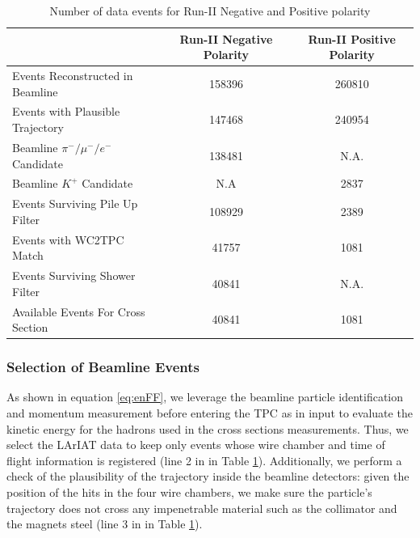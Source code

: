 \begin{table}[b]
\centering
\begin{tabular}{|l|c|c|}
\hline
                                                        & Run-II Negative Polarity   &  Run-II Positive Polarity  \\ \hline
Events Reconstructed in Beamline        &  158396  & 260810  \\ \hline
Events with Plausible Trajectory            &   147468 & 240954  \\ \hline
Beamline $\pi^-/\mu^-/e^-$  Candidate  &   138481 &     N.A.   \\ \hline
Beamline $K^+$   Candidate                 &    N.A       & 2837     \\ \hline
Events Surviving Pile Up Filter              &   108929  & 2389       \\ \hline
Events with WC2TPC Match                 &    41757   & 1081 \\ \hline
Events Surviving Shower Filter             &    40841    &  N.A.     \\ \hline
Available Events For Cross Section      &   40841    &   1081    \\ \hline
\end{tabular}
\caption{Number of data events for Run-II Negative and Positive polarity }
\label{tab:beamlineDataSelection}
\end{table}


\subsubsection{Selection of Beamline Events}\label{ch:beamlineDetectorsData}
As shown in equation \ref{eq:enFF}, we leverage the beamline particle identification and momentum measurement before entering the TPC as in input to evaluate the kinetic energy for the hadrons used in the  cross sections measurements. Thus, we select the LArIAT data to keep only events whose wire chamber and time of flight information is registered (line 2 in in Table \ref{tab:beamlineDataSelection}). Additionally, we perform a check of the plausibility of the trajectory inside the beamline detectors: given the position of the hits in the four wire chambers, we make sure the particle's trajectory does not cross any impenetrable material such as the collimator and the magnets steel (line 3 in in Table \ref{tab:beamlineDataSelection}).


